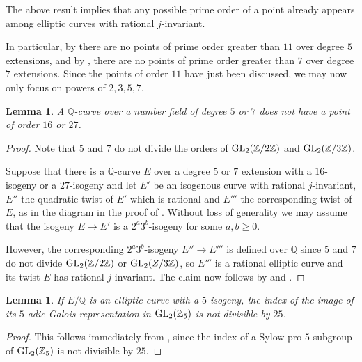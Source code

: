 \documentclass[10pt,leqno]{amsart}
\newcommand{\Z}{\mathbb{Z}}
\newcommand{\Q}{\mathbb{Q}}
\newcommand{\GL}{\textnormal{GL}}
\newtheorem{lemma}[theorem]{Lemma}
\theoremstyle{definition}
\theoremstyle{remark}
\numberwithin{theorem}{section}
\begin{document}
The above result implies that any possible prime order of a point already appears among elliptic curves with rational $j$-invariant.


In particular, by  there are no points of prime order greater than $11$ over degree $5$ extensions, and by \cite[Proposition 7.7]{basechanges}, there are no points of prime order greater than $7$ over degree $7$ extensions. Since the points of order $11$ have just been discussed, we may now only focus on powers of $2,3,5,7$.

\begin{lemma}
    A $\Q$-curve over a number field of degree $5$ or $7$ does not have a point of order $16$ or $27$.
\end{lemma}
\begin{proof}Note that $5$ and $7$ do not divide the orders of $\GL_2(\Z/2\Z)$ and $\GL_2(\Z/3\Z)$.

Suppose that there is a $\Q$-curve $E$ over a degree $5$ or $7$ extension with a $16$-isogeny or a $27$-isogeny and let $E'$ be an isogenous curve with rational $j$-invariant, $E''$ the quadratic twist of $E'$ which is rational and $E'''$ the corresponding twist of $E$, as in the diagram in the proof of .  Without loss of generality we may assume that the isogeny $E \to E'$ is a $2^a 3^b$-isogeny for some $a,b \geq 0$. 

However, the corresponding $2^a3^b$-isogeny $E'' \to E'''$ is defined over $\Q$ since $5$ and $7$ do not divide $\GL_2(\Z/2\Z)$ or $\GL_2(Z/3\Z)$, so $E'''$ is a rational elliptic curve and its twist $E$ has rational $j$-invariant. The claim now follows by  and .
\end{proof}


\begin{lemma}\label{divisibleby25}
    If $E/\Q$ is an elliptic curve with a $5$-isogeny, the index of the image of its $5$-adic Galois representation in $\GL_2(\Z_5)$ is not divisible by $25$.
\end{lemma}
\begin{proof}
    This follows immediately from \cite[Theorem 2.]{greenberg}, since the index of a Sylow pro-$5$ subgroup of $\GL_2(\Z_5)$ is not divisible by $25$.
\end{proof}
\end{document}
